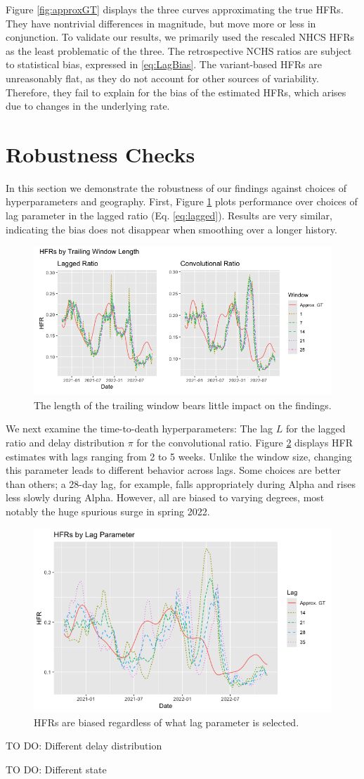 \documentclass{article}
\begin{document}
Figure \ref{fig:approxGT} displays the three curves approximating the true HFRs. They have nontrivial differences in magnitude, but move more or less in conjunction. To validate our results, we primarily used the rescaled NHCS HFRs as the least problematic of the three. The retrospective NCHS ratios are subject to statistical bias, expressed in \ref{eq:LagBias}. The variant-based HFRs are unreasonably flat, as they do not account for other sources of variability. Therefore, they fail to explain for the bias of the estimated HFRs, which arises due to changes in the underlying rate. 

\section{Robustness Checks}\label{apx:robustness}

In this section we demonstrate the robustness of our findings against choices of hyperparameters and geography. First, Figure \ref{fig:window} plots performance over choices of lag parameter in the lagged ratio (Eq. \ref{eq:lagged}). Results are very similar, indicating the bias does not disappear when smoothing over a longer history.

\begin{figure}
    \centering
    \includegraphics[width=0.75\linewidth]{Figs/window_size.png}
    \caption{The length of the trailing window bears little impact on the findings.}
    \label{fig:window}
\end{figure}

We next examine the time-to-death hyperparameters: The lag $L$ for the lagged ratio and delay distribution $\pi$ for the convolutional ratio. Figure \ref{fig:lag} displays HFR estimates with lags ranging from 2 to 5 weeks. Unlike the window size, changing this parameter leads to different behavior across lags. Some choices are better than others; a 28-day lag, for example, falls appropriately during Alpha and rises less slowly during Alpha. However, all are biased to varying degrees, most notably the huge spurious surge in spring 2022.

\begin{figure}
    \centering
    \includegraphics[width=0.7\linewidth]{Figs/hfrs_by_lag.png}
    \caption{HFRs are biased regardless of what lag parameter is selected.}
    \label{fig:lag}
\end{figure}

TO DO: Different delay distribution

TO DO: Different state
\end{document}
